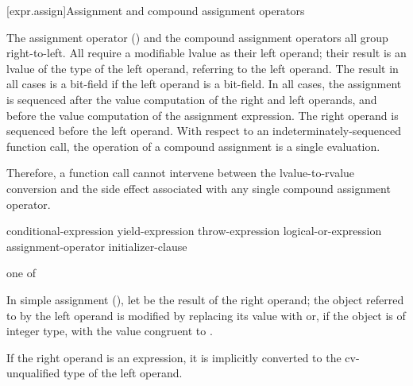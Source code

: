 [expr.assign]{Assignment and compound assignment operators}%

\pnum
{}%
%
%
%
%
%
%
%
%
%
%
%
The assignment operator (\tcode{=}) and the compound assignment
operators all group right-to-left.
%
All
require a modifiable lvalue as their left operand; their result is an lvalue
of the type of the left operand, referring to the left operand. The result in all cases is a bit-field if
the left operand is a bit-field. In all cases, the assignment is
sequenced after the
%
value computation of the right and left operands,
and before the
value computation of the assignment expression.
The right operand is sequenced before the left operand.
With
respect to an indeterminately-sequenced function call, the operation of
a compound assignment is a single evaluation.
\begin{note}
Therefore, a function call cannot intervene between the
lvalue-to-rvalue conversion and the side effect associated with any
single compound assignment operator.
\end{note}

\begin{bnf}
\br
    conditional-expression\br
    yield-expression\br
    throw-expression\br
    logical-or-expression assignment-operator initializer-clause
\end{bnf}

\begin{bnf}
 \textnormal{one of}\br
    \terminal{=  *=  /=  \%=   +=  -=  >>=  <<=  \&=  \caret=  |=}
\end{bnf}

\pnum
In simple assignment (\tcode{=}),
let  be the result of the right operand;
the object referred to by the left operand is
modified by replacing its value
with  or,
if the object is of integer type,
with the value congruent to .

\pnum
{}%
If the right operand is an expression, it is implicitly
converted to the cv-unqualified type of the left
operand.

